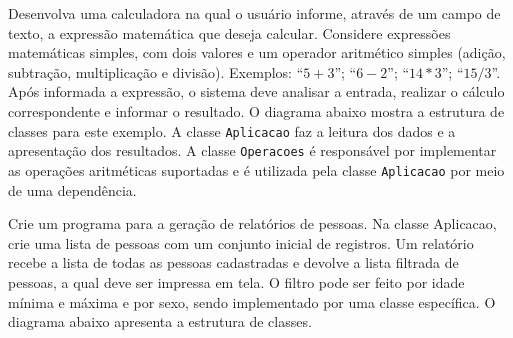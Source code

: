 \begin{exercise}[Calculadora]
Desenvolva uma calculadora na qual o usuário informe, através de um campo de texto, a expressão matemática que deseja calcular. Considere expressões matemáticas simples, com dois valores e um operador aritmético simples (adição, subtração, multiplicação e divisão). Exemplos: ``$5 + 3$''; ``$6 - 2$''; ``$14 * 3$''; ``$15 / 3$''. Após informada a expressão, o sistema deve analisar a entrada, realizar o cálculo correspondente e informar o resultado. O diagrama abaixo mostra a estrutura de classes para este exemplo. A classe \texttt{Aplicacao} faz a leitura dos dados e a apresentação dos resultados. A classe \texttt{Operacoes} é responsável por implementar as operações aritméticas suportadas e é utilizada pela classe \texttt{Aplicacao} por meio de uma dependência.

\begin{figure}[h]
	\centering
\end{figure}

\end{exercise}

\begin{exercise}[RelatorioPessoas]
Crie um programa para a geração de relatórios de pessoas. Na classe Aplicacao, crie uma lista de pessoas com um conjunto inicial de registros. Um relatório recebe a lista de todas as pessoas cadastradas e devolve a lista filtrada de pessoas, a qual deve ser impressa em tela. O filtro pode ser feito por idade mínima e máxima e por sexo, sendo implementado por uma classe específica. O diagrama abaixo apresenta a estrutura de classes.

\begin{figure}[h]
	\centering
\end{figure}

\end{exercise}

